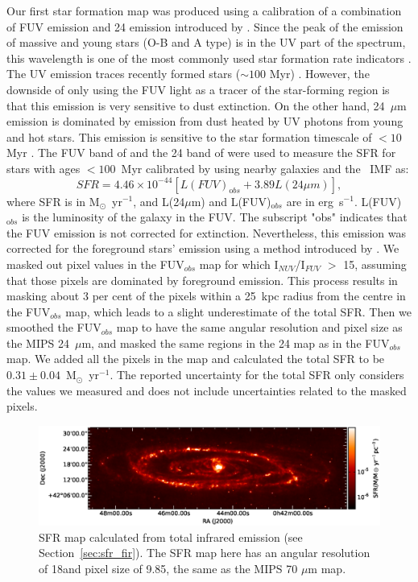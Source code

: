Our first star formation map was produced using a calibration of a combination of FUV emission and 24 \um emission introduced by \citet{Hao11}. Since the peak of the emission of massive and young stars (O-B and A type) is in the UV part of the spectrum, this wavelength is one of the most commonly used star formation rate indicators \citep[e.g.][]{Kennicutt89}. The UV emission traces recently formed stars ($\sim 100$ Myr) \citep[e.g.][]{Kennicutt98a, Calzetti05}. However, the downside of only using the FUV light as a tracer of the star-forming region is that this emission is very sensitive to dust extinction. On the other hand, 24~$\mu$m emission is dominated by emission from dust heated by UV photons from young and hot stars. This emission is sensitive to the star formation timescale of $<10$ Myr \citep{Calzetti07}. The FUV band of \Galex and the 24 \um band of \Spitzer were used to measure the SFR for stars with ages $<100$~Myr calibrated by \citet{Hao11}  using nearby galaxies and the~\citet{Kroupa03} IMF as:
\begin{equation}
\label{equ: fuvplus24}
SFR =4.46\times10^{-44}[L(FUV)_{\mathrm obs}+3.89L(24\mu m)],
\end{equation}
\noindent where SFR is in M$_{\odot}$~yr$^{-1}$, and L(24$\mu$m) and L(FUV)$_{\mathrm obs}$ are in erg~s$^{-1}$. L(FUV)$_{\mathrm obs}$ is the luminosity of the galaxy in the FUV. The subscript "obs" indicates that the FUV emission is not corrected for extinction. Nevertheless, this emission was corrected for the foreground stars' emission using a method introduced by \citet{Leroy08}. We masked out pixel values in the FUV$_{obs}$ map for which I$_{NUV}$/I$_{FUV}$ $>$ 15, assuming that those pixels are dominated by foreground emission. This process results in masking about 3 per cent of the pixels within a 25~kpc radius from the centre in the FUV$_{obs}$ map, which leads to a slight underestimate of the total SFR. 
Then we smoothed the FUV$_{obs}$  map to have the same angular resolution and pixel size as the MIPS 24~$\mu$m, and masked the same regions in the 24 \um map as in the FUV$_{obs}$  map. We added all the pixels in the map and calculated the total SFR to be $0.31\pm 0.04$~M$_{\odot}$~yr$^{-1}$. The reported uncertainty for the total SFR only considers the values we measured and does not include uncertainties related to the masked pixels.


\begin{figure}
    \centering
       \includegraphics[width=\textwidth]{../image_paper1/sfr_fir.eps}
    \caption[SFR map calculated from total infrared emission ]{SFR map calculated from total infrared emission (see Section~\ref{sec:sfr_fir}). The SFR map here has an angular resolution of 18\arcsec and pixel size of 9.85\arcsec, the same as the MIPS 70 $\mu$m map.}
    \label{fig:sfrs}
\end{figure}


